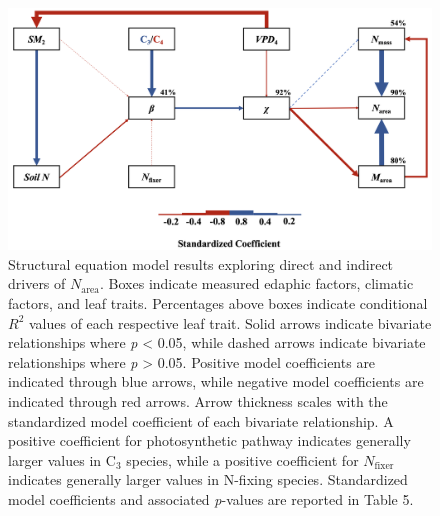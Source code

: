 \newpage
\begin{landscape}
    \begin{figure}
        \centering
        \includegraphics[scale = 0.3]{ch4_TXeco/figs/TXeco_fig5_SEM.png}
        \caption[Structural equation model results exploring direct and indirect drivers of $N_\mathrm{area}$]{Structural equation model results exploring direct and indirect drivers of $N_\mathrm{area}$. Boxes indicate measured edaphic factors, climatic factors, and leaf traits. Percentages above boxes indicate conditional $R^{2}$ values of each respective leaf trait. Solid arrows indicate bivariate relationships where \textit{p} < 0.05, while dashed arrows indicate bivariate relationships where \textit{p} > 0.05. Positive model coefficients are indicated through blue arrows, while negative model coefficients are indicated through red arrows. Arrow thickness scales with the standardized model coefficient of each bivariate relationship. A positive coefficient for photosynthetic pathway indicates generally larger values in C$_3$ species, while a positive coefficient for $N_\mathrm{fixer}$ indicates generally larger values in N-fixing species. Standardized model coefficients and associated \textit{p}-values are reported in Table 5.}
        \label{fig:figure4.5}
    \end{figure}
\end{landscape}
\clearpage


